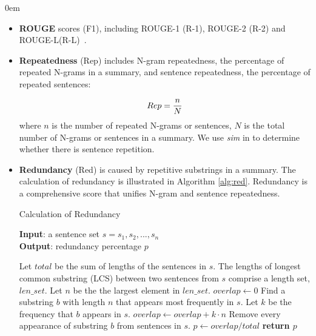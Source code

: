 \itemsep0em
\begin{itemize}

\item \textbf{ROUGE} scores (F1), including ROUGE-1 (R-1), ROUGE-2 (R-2) and
ROUGE-L(R-L)~\cite{rouge-a-package-for-automatic-evaluation-of-summaries}.

\item \textbf{Repeatedness} (Rep) includes N-gram repeatedness, the percentage of repeated N-grams in a summary, and sentence repeatedness, the percentage of repeated sentences:

\begin{equation}
\small Rep = \frac{n}{N}
\end{equation}
where $n$ is the number of repeated N-grams or sentences, 
$N$ is the total number of N-grams or sentences in a summary.
We use \textit{sim} in  to %
determine whether there is sentence repetition.

\item \textbf{Redundancy} (Red) is caused by
repetitive substrings in a summary. 
The calculation of redundancy is illustrated in Algorithm \ref{alg:red}.
Redundancy is a comprehensive score that unifies N-gram and sentence repeatedness.
\begin{algorithm}[tb]
\caption{Calculation of Redundancy}
\scriptsize
\label{alg:red}
\textbf{Input}: a sentence set $s = {s_{1}, s_{2},...,s_{n}}$\\
\textbf{Output}: redundancy percentage $p$
\begin{algorithmic}[1] %
\STATE Let $total$ be the sum of lengths of the sentences in $s$.
\STATE The lengths of longest common substring (LCS) between two sentences from $s$ comprise a length set, $len\_set$.
\STATE Let $n$ be the the largest element in $len\_set$.
\STATE $overlap \leftarrow 0$
\STATE Find a substring $b$ with length $n$ that appears most frequently in $s$.
\STATE Let $k$ be the frequency that $b$ appears in $s$.
\STATE $overlap \leftarrow overlap + k\cdot n$
\STATE Remove every appearance of substring $b$ from sentences in $s$.
\ENDWHILE
\STATE $p \leftarrow overlap/total$
\STATE \textbf{return $p$} 
\end{algorithmic}
\end{algorithm}


\end{itemize}
